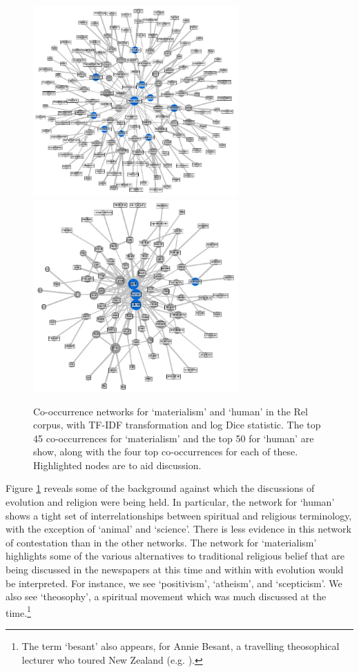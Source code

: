 \documentclass{article}
\begin{document}
\begin{figure}
    \centering
    \includegraphics[width=0.7\textwidth]{images/materialism_main.png}
    \includegraphics[width=0.7\textwidth]{images/human_net_main.png}
    \caption{\footnotesize{Co-occurrence networks for `materialism' and `human' in the Rel corpus, with TF-IDF transformation and log Dice statistic. The top 45 co-occurrences for `materialism' and the top 50 for `human' are show,  along with the four top co-occurrences for each of these. Highlighted nodes are to aid discussion.}}
    \label{f:human-net}
\end{figure}

Figure \ref{f:human-net} reveals some of the background against which the discussions of evolution and religion were being held. In particular, the network for `human' shows a tight set of interrelationships between spiritual and religious terminology, with the exception of `animal' and `science'. There is less evidence in this network of contestation than in the other networks. The network for `materialism' highlights some of the various alternatives to traditional religious belief that are being discussed in the newspapers at this time and within with evolution would be interpreted. For instance, we see `positivism', `atheism', and `scepticism'. We also see `theosophy', a spiritual movement which was much discussed at the time.\footnote{The term `besant' also appears, for Annie Besant, a travelling theosophical lecturer who toured New Zealand (e.g. \cite{besant}).}
\end{document}
